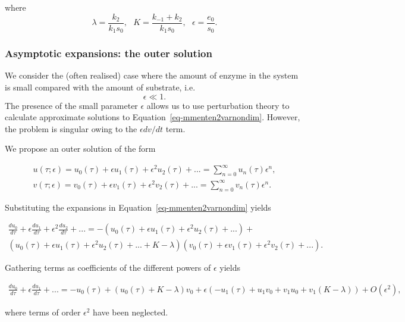 \documentclass[
  letterpaper,
  DIV=11,
  numbers=noendperiod]{scrreprt}
\begin{document}
where \[
\lambda=\frac{k_2}{k_1 s_0}, \ \ \ K=\frac{k_{-1}+k_2}{k_1 s_0}, \ \ \ \epsilon=\frac{e_0}{s_0}. 
\]

\subsubsection{Asymptotic expansions: the outer
solution}\label{asymptotic-expansions-the-outer-solution}

We consider the (often realised) case where the amount of enzyme in the
system is small compared with the amount of substrate, i.e. \[
\epsilon \ll 1.
\] The presence of the small parameter \(\epsilon\) allows us to use
perturbation theory to calculate approximate solutions to
Equation~\ref{eq-mmenten2varnondim}. However, the problem is singular
owing to the \(\epsilon dv/dt\) term.

We propose an outer solution of the form

\[
\begin{aligned}
u(\tau;\epsilon)=u_0(\tau) + \epsilon u_1(\tau) + \epsilon^2 u_2(\tau) + ... = \sum_{n=0}^{\infty}u_n(\tau)\epsilon^n, \nonumber \\
v(\tau;\epsilon)=v_0(\tau) + \epsilon v_1(\tau) + \epsilon^2 v_2(\tau) + ... = \sum_{n=0}^{\infty}v_n(\tau)\epsilon^n.  \nonumber  
\end{aligned}
\]

Substituting the expansions in Equation~\ref{eq-mmenten2varnondim}
yields

\[
\begin{aligned}
\frac{du_0}{d\tau} + \epsilon \frac{du_1}{d\tau} + \epsilon^2\frac{du_2}{d\tau} + ... = -(u_0(\tau) + \epsilon u_1(\tau) + \epsilon^2 u_2(\tau) + ...)+  \nonumber \\ (u_0(\tau) + \epsilon u_1(\tau) + \epsilon^2 u_2(\tau) + ...+ K-\lambda)(v_0(\tau) + \epsilon v_1(\tau) + \epsilon^2 v_2(\tau) + ...).  \nonumber 
\end{aligned}
\]

Gathering terms as coefficients of the different powers of \(\epsilon\)
yields

\[
\begin{aligned}
\frac{du_0}{d\tau} + \epsilon \frac{du_1}{d\tau} + ... = -u_0(\tau)+ (u_0(\tau)+ K-\lambda)v_0  +\epsilon (-u_1(\tau) + u_1v_0+v_1u_0+v_1(K-\lambda)) + O(\epsilon^2), \nonumber
\end{aligned}
\]

where terms of order \(\epsilon^2\) have been neglected.
\end{document}
